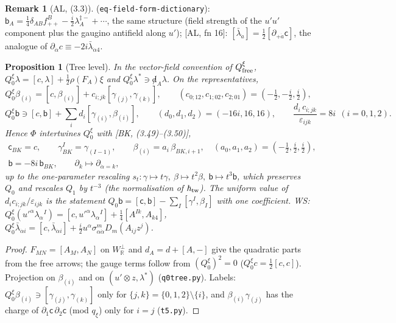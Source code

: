 \documentclass[11pt]{article}
\newtheorem{proposition}[theorem]{Proposition}
\theoremstyle{definition}
\newtheorem{remark}[theorem]{Remark}
\newcommand{\Qx}{Q^{\xi}}
\newcommand{\WS}{\textup{WS}}
\begin{document}
\begin{remark}
[AL, (3.3)] (\texttt{eq-field-form-dictionary}): $\mathsf b_A=\tfrac14\delta_{AB}f^B_{++}-\tfrac i2\lambda^{\ddagger-}_A+\cdots$, the same structure (field strength of the $u'u'$ component plus the gaugino antifield along $u'$); [AL, fn 16]: $[\bar\lambda_{\dot a}]=\tfrac12[\partial_{+\dot a}\mathsf c]$, the analogue of $\partial_{\dot\alpha}c\equiv-2i\bar\lambda_{\dot\alpha4}$.
\end{remark}

\begin{proposition}[Tree level]\label{prop:tree}
In the vector-field convention of $\Qx_{\rm free}$, $\Qx_0\lambda=[c,\lambda]+\tfrac12\rho(F_A)\xi$ and $\Qx_0\lambda^*\ni{\not d}_A\lambda$. On the representatives,
\[
\Qx_0\beta_{(i)}=[c,\beta_{(i)}]+c_{i;jk}[\gamma_{(j)},\gamma_{(k)}],\qquad (c_{0;12},c_{1;02},c_{2;01})=(-\tfrac12,-\tfrac i2,\tfrac i2),
\]
\[
\Qx_0\mathsf b\ni[c,\mathsf b]+\textstyle\sum_id_i[\gamma_{(i)},\beta_{(i)}],\qquad (d_0,d_1,d_2)=(-16i,16,16),\qquad \frac{d_i\,c_{i;jk}}{\varepsilon_{ijk}}=8i\ \ (i=0,1,2).
\]
Hence $\Phi$ intertwines $\Qx_0$ with [BK, (3.49)--(3.50)],
\[
\begin{gathered}\mathsf c_{BK}=c,\qquad\gamma^{I}_{BK}=\gamma_{(I-1)},\qquad \beta_{(i)}=a_i\,\beta_{BK,i+1},\quad (a_0,a_1,a_2)=(-\tfrac12,\tfrac i2,\tfrac i2),\\ \mathsf b=-8i\,\mathsf b_{BK},\qquad \partial_k\mapsto\partial_{\dot\alpha=k},\end{gathered}
\]
up to the one-parameter rescaling $s_t:\gamma\mapsto t\gamma,\ \beta\mapsto t^2\beta,\ \mathsf b\mapsto t^3\mathsf b$, which preserves $Q_0$ and rescales $Q_1$ by $t^{-3}$ (the normalisation of $\hbar_{\rm tw}$). The uniform value of $d_ic_{i;jk}/\varepsilon_{ijk}$ is the statement $Q_0\mathsf b=[\mathsf c,\mathsf b]-\sum_I[\gamma^I,\beta_I]$ with one coefficient.
\WS: $\Qx_0(u'^\alpha\lambda_\alpha{}^I)=[c,u'^\alpha\lambda_\alpha{}^I]+\tfrac14[A^{Ik},A_{k4}]$, $\Qx_0\bar\lambda_{\dot\alpha i}=[c,\bar\lambda_{\dot\alpha i}]+\tfrac i2u^\alpha\sigma^m_{\alpha\dot\alpha}D_m(A_{ij}z^j)$.
\end{proposition}
\begin{proof}
$F_{MN}=[A_M,A_N]$ on $W_{\mathbb R}^\perp$ and $d_A=d+[A,-]$ give the quadratic parts from the free arrows; the gauge terms follow from ${(\Qx_0)}^2=0$ ($\Qx_0c=\tfrac12[c,c]$). Projection on $\beta_{(i)}$ and on $(u'\otimes z,\lambda^*)$ (\texttt{q0tree.py}). Labels: $\Qx_0\beta_{(i)}\ni[\gamma_{(j)},\gamma_{(k)}]$ only for $\{j,k\}=\{0,1,2\}\setminus\{i\}$, and $\beta_{(i)}\gamma_{(j)}$ has the charge of $\partial_1\mathsf c\,\partial_2\mathsf c$ (mod $q_\xi$) only for $i=j$ (\texttt{t5.py}).
\end{proof}
\end{document}
